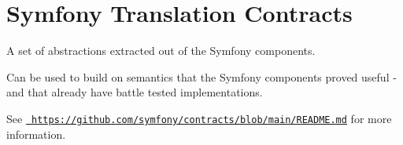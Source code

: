 \chapter{Symfony Translation Contracts}
\hypertarget{md_public_2glpi_2vendor_2symfony_2translation-contracts_2_r_e_a_d_m_e}{}\label{md_public_2glpi_2vendor_2symfony_2translation-contracts_2_r_e_a_d_m_e}
A set of abstractions extracted out of the Symfony components.

Can be used to build on semantics that the Symfony components proved useful -\/ and that already have battle tested implementations.

See \href{https://github.com/symfony/contracts/blob/main/README.md}{\texttt{ https\+://github.\+com/symfony/contracts/blob/main/\+README.\+md}} for more information. 